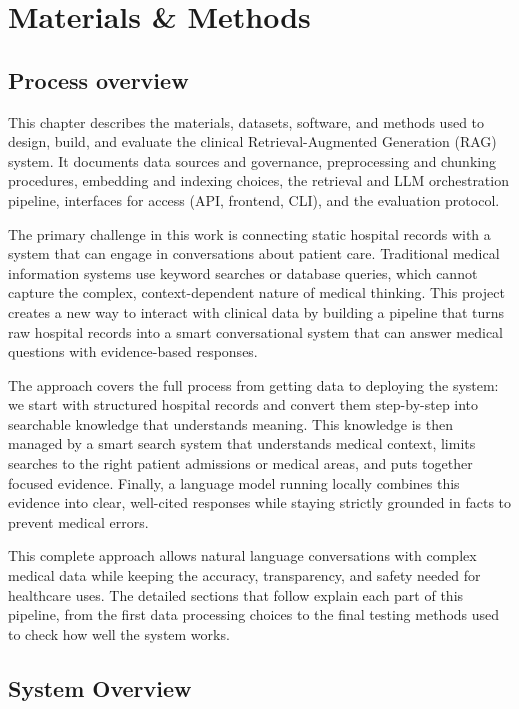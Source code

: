 \chapter{Materials \& Methods}

\section{Process overview}
This chapter describes the materials, datasets, software, and methods used to design, build, and evaluate the clinical Retrieval-Augmented Generation (RAG) system. It documents data sources and governance, preprocessing and chunking procedures, embedding and indexing choices, the retrieval and LLM orchestration pipeline, interfaces for access (API, frontend, CLI), and the evaluation protocol.

The primary challenge in this work is connecting static hospital records with a system that can engage in conversations about patient care. Traditional medical information systems use keyword searches or database queries, which cannot capture the complex, context-dependent nature of medical thinking. This project creates a new way to interact with clinical data by building a pipeline that turns raw hospital records into a smart conversational system that can answer medical questions with evidence-based responses.


The approach covers the full process from getting data to deploying the system: we start with structured hospital records and convert them step-by-step into searchable knowledge that understands meaning. This knowledge is then managed by a smart search system that understands medical context, limits searches to the right patient admissions or medical areas, and puts together focused evidence. Finally, a language model running locally combines this evidence into clear, well-cited responses while staying strictly grounded in facts to prevent medical errors.

This complete approach allows natural language conversations with complex medical data while keeping the accuracy, transparency, and safety needed for healthcare uses. The detailed sections that follow explain each part of this pipeline, from the first data processing choices to the final testing methods used to check how well the system works.

\newpage
\section{System Overview}


